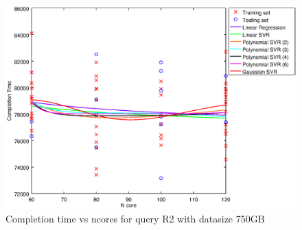 
\begin {figure}[hbtp]
\centering
\includegraphics[width=\textwidth]{output/R2_750_ONLY_1_OVER_NCORES/plot_R2_750.eps}
\caption{Completion time vs ncores for query R2 with datasize 750GB}
\label{fig:all_nonlinear_R2_750}
\end {figure}
